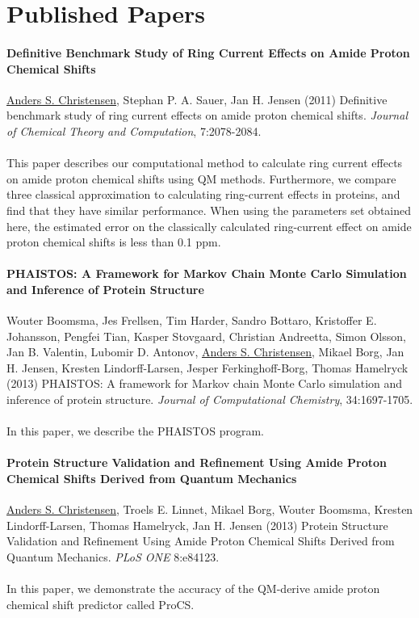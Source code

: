 \chapter{Published Papers}

\subsubsection{Definitive Benchmark Study of Ring Current Effects on Amide Proton Chemical Shifts}
\underline{Anders S. Christensen}, Stephan P. A. Sauer, Jan H. Jensen (2011) Definitive benchmark study of ring current effects on amide proton chemical shifts. \textit{Journal of Chemical Theory and Computation}, 7:2078-2084.
\\\\ This paper describes our computational method to calculate ring current effects on amide proton chemical shifts using QM methods.
Furthermore, we compare three classical approximation to calculating ring-current effects in proteins, and find that they have similar performance.
When using the parameters set obtained here, the estimated error on the classically calculated ring-current effect on amide proton chemical shifts is less than 0.1 ppm.
\clearpage


\subsubsection{PHAISTOS: A Framework for Markov Chain Monte Carlo Simulation and Inference of Protein Structure}
Wouter Boomsma, Jes Frellsen, Tim Harder, Sandro Bottaro, Kristoffer E. Johansson, Pengfei Tian, Kasper Stovgaard, Christian Andreetta, Simon Olsson, Jan B. Valentin, Lubomir D. Antonov, \underline{Anders S. Christensen}, Mikael Borg, Jan H. Jensen, Kresten Lindorff-Larsen, Jesper Ferkinghoff-Borg, Thomas Hamelryck (2013) PHAISTOS: A framework for Markov chain Monte Carlo simulation and inference of protein structure. \textit{Journal of Computational Chemistry}, 34:1697-1705.
\\\\ In this paper, we describe the PHAISTOS program.
\clearpage


\subsubsection{Protein Structure Validation and Refinement Using Amide Proton Chemical Shifts Derived from Quantum Mechanics}
\underline{Anders S. Christensen}, Troels E. Linnet, Mikael Borg, Wouter Boomsma, Kresten Lindorff-Larsen, Thomas Hamelryck, Jan H. Jensen (2013)  Protein Structure Validation and Refinement Using Amide Proton Chemical Shifts Derived from Quantum Mechanics. \textit{PLoS ONE} 8:e84123.
\\\\ In this paper, we demonstrate the accuracy of the QM-derive amide proton chemical shift predictor called ProCS.
\clearpage


